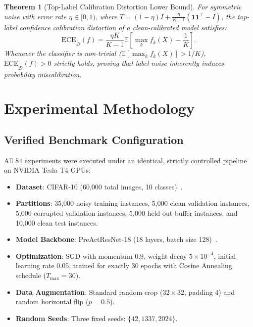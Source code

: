 \documentclass[journal]{IEEEtran}
\newtheorem{theorem}{Theorem}
\theoremstyle{definition}
\begin{document}
\begin{theorem}[Top-Label Calibration Distortion Lower Bound]
\label{thm:top_ece}
For symmetric noise with error rate $\eta \in [0, 1)$, where $T = (1 - \eta) I + \frac{\eta}{K - 1} (\mathbf{1}\mathbf{1}^\top - I)$, the top-label confidence calibration distortion of a clean-calibrated model satisfies:
\begin{equation}
\text{ECE}_{\tilde{\mathcal{D}}}(f) = \frac{\eta K}{K - 1} \mathbb{E} \left[ \max_{k} f_k(X) - \frac{1}{K} \right].
\end{equation}
Whenever the classifier is non-trivial ($\mathbb{E}[\max_k f_k(X)] > 1/K$), $\text{ECE}_{\tilde{\mathcal{D}}}(f) > 0$ strictly holds, proving that label noise inherently induces probability miscalibration.
\end{theorem}

\section{Experimental Methodology}

\subsection{Verified Benchmark Configuration}
All 84 experiments were executed under an identical, strictly controlled pipeline on NVIDIA Tesla T4 GPUs:
\begin{itemize}
    \item \textbf{Dataset}: CIFAR-10 (60,000 total images, 10 classes)~\cite{krizhevsky2009learning}.
    \item \textbf{Partitions}: 35,000 noisy training instances, 5,000 clean validation instances, 5,000 corrupted validation instances, 5,000 held-out buffer instances, and 10,000 clean test instances.
    \item \textbf{Model Backbone}: PreActResNet-18 (18 layers, batch size 128)~\cite{he2016identity}.
    \item \textbf{Optimization}: SGD with momentum $0.9$, weight decay $5 \times 10^{-4}$, initial learning rate $0.05$, trained for exactly 30 epochs with Cosine Annealing schedule ($T_{\max} = 30$).
    \item \textbf{Data Augmentation}: Standard random crop ($32 \times 32$, padding 4) and random horizontal flip ($p=0.5$).
    \item \textbf{Random Seeds}: Three fixed seeds: $\{42, 1337, 2024\}$.
\end{itemize}
\end{document}
